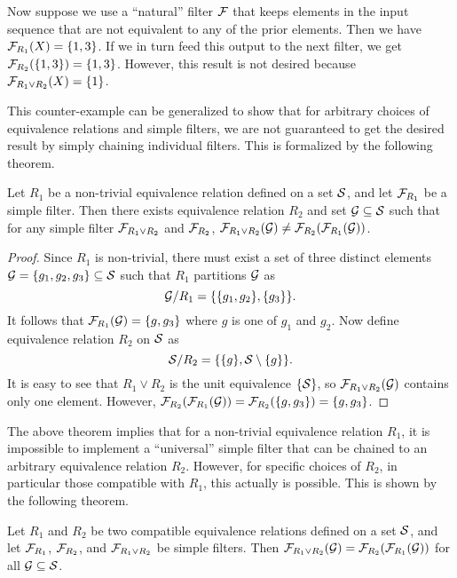 Now suppose we use a ``natural'' filter $\mathcal{F}$ that keeps elements in the input sequence that are not equivalent to any of the prior elements. Then we have $\mathcal{F}_{R_1}(X) = \{ 1, 3 \}$. If we in turn feed this output to the next filter, we get $\mathcal{F}_{R_2}(\{1,3\}) = \{1,3 \}$. However, this result is not desired because $\mathcal{F}_{R_1 \vee R_2}(X) = \{1\}$.

This counter-example can be generalized to show that for arbitrary choices of equivalence relations and simple filters, we are not guaranteed to get the desired result by simply chaining individual filters. This is formalized by the following theorem.

\begin{theorem}
Let $R_1$ be a non-trivial equivalence relation defined on a set $\mathcal{S}$, and let $\mathcal{F}_{R_1}$ be a simple filter. Then there exists equivalence relation $R_2$ and set $\mathcal{G} \subseteq \mathcal{S}$ such that for any simple filter $\mathcal{F}_{R_1 \vee R_2}$ and $\mathcal{F}_{R_2}$, $\mathcal{F}_{R_1 \vee R_2}(\mathcal{G}) \ne \mathcal{F}_{R_2}(\mathcal{F}_{R_1}(\mathcal{G}))$.
\end{theorem}

\begin{proof}
Since $R_1$ is non-trivial, there must exist a set of three distinct elements $\mathcal{G} = \{ g_1, g_2, g_3 \} \subseteq \mathcal{S}$ such that $R_1$ partitions $\mathcal{G}$ as
\[
\mathcal{G} / R_1 = \{ \{ g_1, g_2 \}, \{ g_3 \} \} .
\]
It follows that $\mathcal{F}_{R_1} (\mathcal{G}) = \{ g, g_3 \}$ where $g$ is one of $g_1$ and $g_2$. 
Now define equivalence relation $R_2$ on $\mathcal{S}$ as
\[
\mathcal{S} / R_2 = \{ \{g\}, \mathcal{S} \setminus \{g\} \} .
\]
It is easy to see that $R_1 \vee R_2$ is the unit equivalence $\{ \mathcal{S} \}$, so $\mathcal{F}_{R_1 \vee R_2}(\mathcal{G})$ contains only one element. However, $\mathcal{F}_{R_2}(\mathcal{F}_{R_1}(\mathcal{G})) = \mathcal{F}_{R_2}(\{ g, g_3 \}) = \{ g, g_3 \}$.
\end{proof}

The above theorem implies that for a non-trivial equivalence relation $R_1$, it is impossible to implement a ``universal'' simple filter that can be chained to an arbitrary equivalence relation $R_2$. However, for specific choices of $R_2$, in particular those compatible with $R_1$, this actually is possible. This is shown by the following theorem.

\begin{theorem}
Let $R_1$ and $R_2$ be two compatible equivalence relations defined on a set $\mathcal{S}$, and let $\mathcal{F}_{R_1}$, $\mathcal{F}_{R_2}$, and $\mathcal{F}_{R_1 \vee R_2}$ be simple filters. Then $\mathcal{F}_{R_1 \vee R_2}(\mathcal{G}) = \mathcal{F}_{R_2}(\mathcal{F}_{R_1}(\mathcal{G}))$ for all $\mathcal{G} \subseteq \mathcal{S}$.
\end{theorem}

